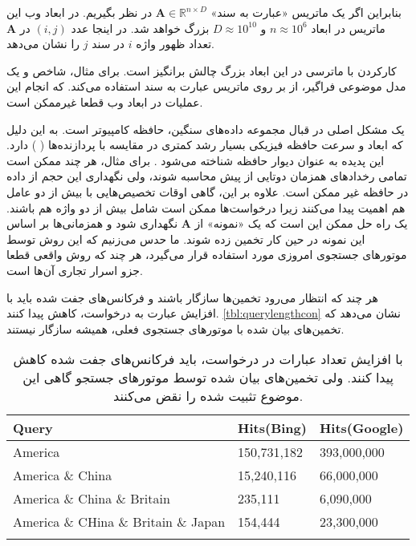 بنابراین اگر یک ماتریس «عبارت به سند» 
$\mathbf{A} \in \mathbb{R}^{n \times D}$
در نظر بگیریم. در ابعاد وب این ماتریس در ابعاد 
$n \approx 10^6$
و 
$D \approx 10^10$
بزرگ خواهد شد.
در اینجا عدد 
$(i,j)$
در 
$\mathbf{A}$
تعداد ظهور واژه 
$i$
در سند 
$j$
را نشان می‌دهد.

کارکردن با ماترسی در این ابعاد بزرگ چالش برانگیز است. برای مثال، شاخص 
\cite{litez58}
و یک مدل موضوعی فراگیر، از 
بر روی ماتریس عبارت به سند استفاده می‌کند. که انجام این عملیات در ابعاد وب قطعا غیرممکن است.

یک مشکل اصلی در قبال مجموعه داده‌های سنگین، حافظه کامپیوتر است. به این دلیل که ابعاد و سرعت حافظه فیزیکی بسیار رشد کمتری در مقایسه با پردازنده‌ها (
) دارد. این پدیده به عنوان دیوار حافظه شناخته می‌شود
\cite{litez139, litez168}
. برای مثال،‌ هر چند ممکن است تمامی رخداد‌های همزمان دوتایی از پیش محاسبه شوند، ولی نگهداری این حجم از داده در حافظه غیر ممکن است. علاوه بر این، گاهی اوقات تخصیص‌‌هایی با بیش از دو عامل هم اهمیت پیدا می‌کنند زیرا درخواست‌ها ممکن است شامل بیش از دو واژه هم باشند. یک راه حل ممکن این است که یک «نمونه» از 
$\mathbf{A}$
 نگهداری شود و همزمانی‌ها بر اساس این نمونه در حین کار تخمین زده شوند. ما حدس می‌زنیم که این روش توسط موتورهای جستجوی امروزی مورد استفاده قرار می‌گیرد، هر چند که روش واقعی قطعا جزو اسرار تجاری آن‌ها است.

هر چند که انتظار می‌رود تخمین‌ها سازگار باشند و فرکانس‌های جفت شده باید با افزایش عبارت به درخواست، کاهش پیدا کنند. 
\autoref{tbl:querylengthcon}
نشان می‌دهد که تخمین‌های بیان شده با موتورهای جستجوی فعلی، همیشه سازگار نیستند.
\begin{table}[h]
\centering
\begin{latin}
\begin{tabular}{lll}
\hhline{===}
Query        				& Hits(Bing)    & Hits(Google) 	\\ \hline
America            			& 150,731,182 	& 393,000,000 	\\
America \& China          		& 15,240,116  	& 66,000,000 	\\
America \& China \& Britain     	& 235,111     	& 6,090,000     \\
America \& CHina \& Britain \& Japan 	& 154,444     	& 23,300,000    \\
\hhline{===}
\end{tabular}
\end{latin}
\caption{
با افزایش تعداد عبارات در درخواست، باید فرکانس‌های جفت شده کاهش پیدا کنند. ولی تخمین‌های بیان شده توسط موتورهای جستجو گاهی این موضوع تثبیت شده را نقض می‌کنند.
}
\label{tbl:querylengthcon}
\end{table}

